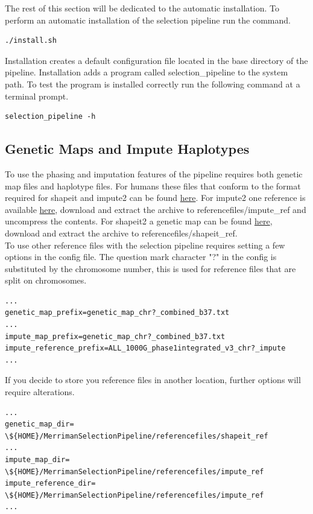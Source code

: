 The rest of this section will be dedicated to the automatic installation. To perform an automatic installation of the selection pipeline run the command.\\
\begin{verbatim}
./install.sh
\end{verbatim}

Installation creates a default configuration file located in the base directory of the pipeline. Installation adds a program called selection\_pipeline to the system path. To test the program is installed correctly run the following command at a terminal prompt.

\begin{verbatim}
selection_pipeline -h
\end{verbatim}

\subsection{Genetic Maps and Impute Haplotypes}
To use the phasing and imputation features of the pipeline requires both genetic map files and haplotype files. For humans these files that conform to the format required for shapeit and impute2 can be found \href{http://mathgen.stats.ox.ac.uk/impute/impute_v2.html#reference}{here}. For impute2 one reference is available \href{http://mathgen.stats.ox.ac.uk/impute/ALL_1000G_phase1integrated_v3_impute_macGT1.tgz}{here}, download and extract the archive to referencefiles/impute\_ref and uncompress the contents. For shapeit2 a genetic map can be found \href{http://www.shapeit.fr/files/genetic_map_b37.tar.gz}{here}, download and extract the archive to referencefiles/shapeit\_ref.\\

To use other reference files with the selection pipeline requires setting a few options in the config file. The question mark character "?" in the config is substituted by the chromosome number, this is used for reference files that are split on chromosomes.\\
\begin{verbatim}
...
genetic_map_prefix=genetic_map_chr?_combined_b37.txt
...
impute_map_prefix=genetic_map_chr?_combined_b37.txt
impute_reference_prefix=ALL_1000G_phase1integrated_v3_chr?_impute
...
\end{verbatim}

If you decide to store you reference files in another location, further options will require alterations.\\ 
\begin{verbatim}
...
genetic_map_dir= \${HOME}/MerrimanSelectionPipeline/referencefiles/shapeit_ref
...
impute_map_dir= \${HOME}/MerrimanSelectionPipeline/referencefiles/impute_ref
impute_reference_dir= \${HOME}/MerrimanSelectionPipeline/referencefiles/impute_ref
...
\end{verbatim}

